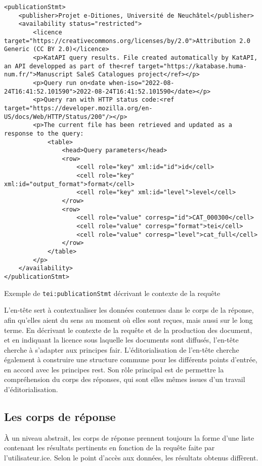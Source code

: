 \begin{listing}[hp!]
	\begin{verbatim}
<publicationStmt>
	<publisher>Projet e-Ditiones, Université de Neuchâtel</publisher>
	<availability status="restricted">
		<licence target="https://creativecommons.org/licenses/by/2.0">Attribution 2.0 Generic (CC BY 2.0)</licence>
		<p>KatAPI query results. File created automatically by KatAPI, an API developped as part of the<ref target="https://katabase.huma-num.fr/">Manuscript SaleS Catalogues project</ref></p>
		<p>Query run on<date when-iso="2022-08-24T16:41:52.101590">2022-08-24T16:41:52.101590</date></p>
		<p>Query ran with HTTP status code:<ref target="https://developer.mozilla.org/en-US/docs/Web/HTTP/Status/200"/></p>
		<p>The current file has been retrieved and updated as a response to the query:
			<table>
				<head>Query parameters</head>
				<row>
					<cell role="key" xml:id="id">id</cell>
					<cell role="key" xml:id="output_format">format</cell>
					<cell role="key" xml:id="level">level</cell>
				</row>
				<row>
					<cell role="value" corresp="id">CAT_000300</cell>
					<cell role="value" corresp="format">tei</cell>
					<cell role="value" corresp="level">cat_full</cell>
				</row>
			</table>
		</p>
	</availability>
</publicationStmt>
	\end{verbatim}
	\caption{Exemple de \texttt{tei:publicationStmt} décrivant le contexte de la requête}
	\label{code:api_header_context_tei}
\end{listing}

L'en-tête sert à contextualiser les données contenues dans le corps de la réponse, afin qu'elles aient du sens au moment où elles sont reçues, mais aussi sur le long terme. En décrivant le contexte de la requête et de la production des document, et en indiquant la licence sous laquelle les documents sont diffusés, l'en-tête cherche à s'adapter aux principes \gls{fair}. L'éditorialisation de l'en-tête cherche également à construire une structure commune pour les différents points d'entrée, en accord avec les principes \gls{rest}. Son rôle principal est de permettre la compréhension du corps des réponses, qui sont elles mêmes issues d'un travail d'éditorialisation.

\subsection{Les corps de réponse}
À un niveau abstrait, les corps de réponse prennent toujours la forme d'une liste contenant les résultats pertinents en fonction de la requête faite par l'utilisateur.ice. Selon le point d'accès aux données, les résultats obtenus diffèrent.

